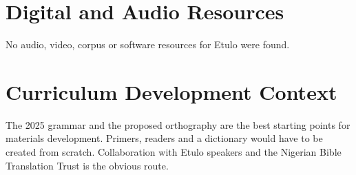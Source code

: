 \documentclass[12pt]{article}
\begin{document}
\section{Digital and Audio Resources}
No audio, video, corpus or software resources for Etulo were found.

\section{Curriculum Development Context}
The 2025 grammar and the proposed orthography are the best starting points for materials development. Primers, readers and a dictionary would have to be created from scratch. Collaboration with Etulo speakers and the Nigerian Bible Translation Trust is the obvious route.
\end{document}
